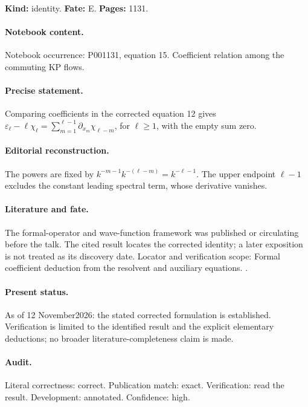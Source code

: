 \noindent\textbf{Kind:} identity. \textbf{Fate:} E. \textbf{Pages:} 1131.\par

\paragraph{Notebook content.} Notebook occurrence: P001131, equation 15. Coefficient relation among the commuting KP flows.

\paragraph{Precise statement.} Comparing coefficients in the corrected equation 12 gives \(\varepsilon_\ell-\ell\chi_\ell=\sum_{m=1}^{\ell-1}\partial_{x_m}\chi_{\ell-m}\), for \(\ell\ge1\), with the empty sum zero.

\paragraph{Editorial reconstruction.} The powers are fixed by \(k^{-m-1}k^{-(\ell-m)}=k^{-\ell-1}\). The upper endpoint \(\ell-1\) excludes the constant leading spectral term, whose derivative vanishes.

\paragraph{Literature and fate.} The formal-operator and wave-function framework was published or circulating before the talk. The cited result locates the corrected identity; a later exposition is not treated as its discovery date. Locator and verification scope: Formal coefficient deduction from the resolvent and auxiliary equations. \cite{cherednik1978differential,segalwilson1985loop}.

\paragraph{Present status.} As of 12 November2026: the stated corrected formulation is established. Verification is limited to the identified result and the explicit elementary deductions; no broader literature-completeness claim is made.

\paragraph{Audit.} Literal correctness: correct. Publication match: exact. Verification: read the result. Development: annotated. Confidence: high.

